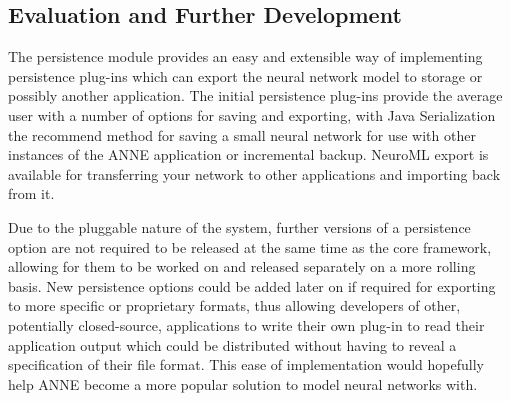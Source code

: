 \documentclass{acm_proc_article-sp}
\begin{document}
\subsection{Evaluation and Further Development}
{
The persistence module provides an easy and extensible way of implementing persistence plug{}-ins which can export the neural network model to storage or possibly another application. The initial persistence plug{}-ins provide the average user with a number of options for saving and exporting, with Java Serialization the recommend method for saving a small neural network for use with other instances of the ANNE application or incremental backup. NeuroML export is available for transferring your network to other applications and importing back from it.

Due to the pluggable nature of the system, further versions of a persistence option are not required to be released at the same time as the core framework, allowing for them to be worked on and released separately on a more rolling basis. New persistence options could be added later on if required for exporting to more specific or proprietary formats, thus allowing developers of other, potentially closed{}-source, applications to write their own plug{}-in to read their application output which could be distributed without having to reveal a specification of their file format. This ease of implementation would hopefully help ANNE become a more popular solution to model neural networks with.

}
\end{document}
